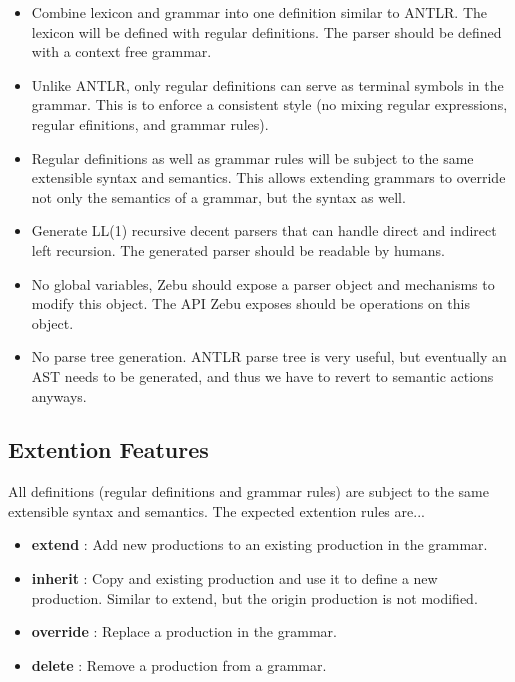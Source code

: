 \documentclass[12pt]{article}
\begin{document}
\begin{itemize}

\item Combine lexicon and grammar into one definition similar to ANTLR. The lexicon will be defined with regular definitions. The parser should be defined with a context free grammar.

\item Unlike ANTLR, only regular definitions can serve as terminal symbols in the grammar. This is to enforce a consistent style (no mixing regular expressions, regular efinitions, and grammar rules).

\item Regular definitions as well as grammar rules will be subject to the same extensible syntax and semantics. This allows extending grammars to override not only the semantics of a grammar, but the syntax as well.

\item Generate LL(1) recursive decent parsers that can handle direct and indirect left recursion. The generated parser should be readable by humans.

\item No global variables, Zebu should expose a parser object and mechanisms to modify this object. The API Zebu exposes should be operations on this object.

\item No parse tree generation. ANTLR parse tree is very useful, but eventually an AST needs to be generated, and thus we have to revert to semantic actions anyways.

\end{itemize}

\subsection{Extention Features}

All definitions (regular definitions and grammar rules) are subject to the same extensible syntax and semantics. The expected extention rules are...

\begin{itemize}

\item \textbf{extend} : Add new productions to an existing production in the grammar.

\item \textbf{inherit} : Copy and existing production and use it to define a new production. Similar to extend, but the origin production is not modified.

\item \textbf{override} : Replace a production in the grammar.

\item \textbf{delete} : Remove a production from a grammar.

\end{itemize}
\end{document}
